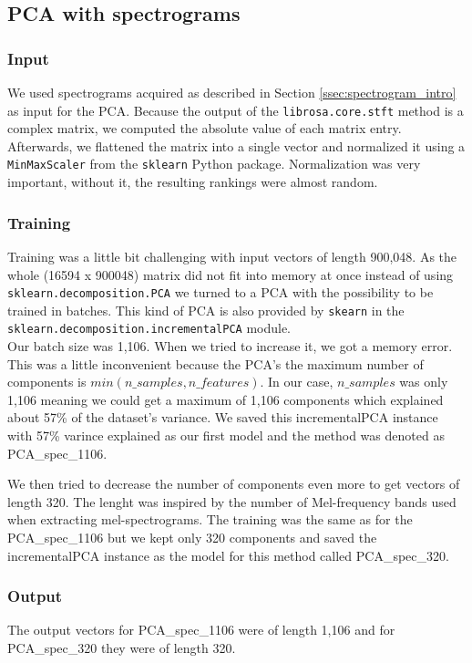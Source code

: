 \subsection{PCA with spectrograms}\label{ssec:PCA_spec_experiments}

\subsubsection{Input}
We used spectrograms acquired as described in Section \ref{ssec:spectrogram_intro} as input for the PCA. Because the output of the \texttt{librosa.core.stft} method is a complex matrix, we computed the absolute value of each matrix entry. Afterwards, we flattened the matrix into a single vector and normalized it using a \texttt{MinMaxScaler} from the \texttt{sklearn} Python package. Normalization was very important, without it, the resulting rankings were almost random.

\subsubsection{Training}
Training was a little bit challenging with input vectors of length 900,048. As the whole (16594 x 900048) matrix did not fit into memory at once instead of using \texttt{sklearn.decomposition.PCA} we turned to a PCA with the possibility to be trained in batches. This kind of PCA is also provided by \texttt{skearn} in the \texttt{sklearn.decomposition.incrementalPCA} module. \\ 
Our batch size was 1,106. When we tried to increase it, we got a memory error. This was a little inconvenient because the PCA's the maximum number of components is $min(n\_samples, n\_features)$. In our case, $n\_samples$ was only 1,106 meaning we could get a maximum of 1,106 components which explained about 57\% of the dataset's variance. We saved this incrementalPCA instance with 57\% varince explained as our first model and the method was denoted as PCA\_spec\_1106. 

We then tried to decrease the number of components even more to get vectors of length 320. The lenght was inspired by the number of Mel-frequency bands used when extracting mel-spectrograms. The training was the same as for the PCA\_spec\_1106 but we kept only 320 components and saved the incrementalPCA instance as the model for this method called PCA\_spec\_320.

\subsubsection{Output}
The output vectors for PCA\_spec\_1106 were of length 1,106 and for PCA\_spec\_320 they were of length 320.

